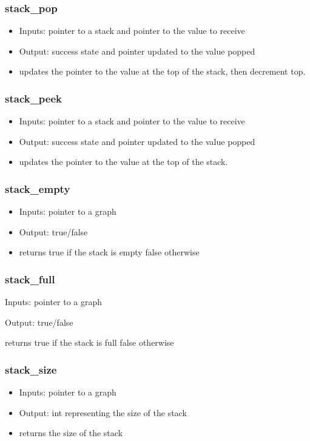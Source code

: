 \documentclass{article}
\begin{document}
\subsubsection{stack\_pop}
\begin{itemize}
    \item Inputs: pointer to a stack and pointer to the value to receive 
    \item Output: success state and pointer updated to the value popped
    \item updates the pointer to the value at the top of the stack, then decrement top.
\end{itemize}
\subsubsection{stack\_peek}
\begin{itemize}
    \item Inputs: pointer to a stack and pointer to the value to receive 
    \item Output: success state and pointer updated to the value popped
    \item updates the pointer to the value at the top of the stack. 
\end{itemize}
\subsubsection{stack\_empty}
\begin{itemize}
    \item Inputs: pointer to a graph 
    \item Output: true/false
    \item returns true if the stack is empty false otherwise
\end{itemize}
\subsubsection{stack\_full}
    \item Inputs: pointer to a graph 
    \item Output: true/false
    \item returns true if the stack is full false otherwise
\begin{itemize}
\end{itemize}
\subsubsection{stack\_size}
\begin{itemize}
    \item Inputs: pointer to a graph
    \item Output: int representing the size of the stack
    \item returns the size of the stack
\end{itemize}
\end{document}
